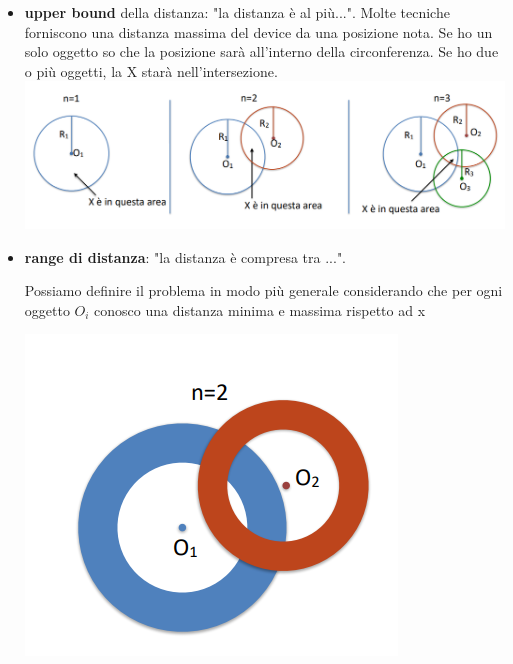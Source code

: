 \begin{itemize}
\begin{itemize}
        \item \textbf{upper bound} della distanza: "la distanza è al più...".
        Molte tecniche forniscono una distanza massima del device da una posizione nota.
        Se ho un solo oggetto so che la posizione sarà all'interno della circonferenza. Se ho due o più oggetti, la X starà nell'intersezione.
        \\ \includegraphics[width=.9\textwidth]{images/Mobile computing/4. Posizione/upper bound.PNG}
        \item \textbf{range di distanza}: "la distanza è compresa tra ...". \\
        \begin{minipage}{.4\textwidth}
           Possiamo definire il problema in modo più generale considerando che per ogni oggetto $O_i$ conosco una distanza minima e massima rispetto ad x
        \end{minipage} 
        \hfill
        \begin{minipage}{.6\textwidth}
            \begin{center}
                \includegraphics[width=.45\textwidth]{images/Mobile computing/4. Posizione/range di distanza.PNG}
            \end{center}
        \end{minipage}
    \end{itemize}
\end{itemize}

